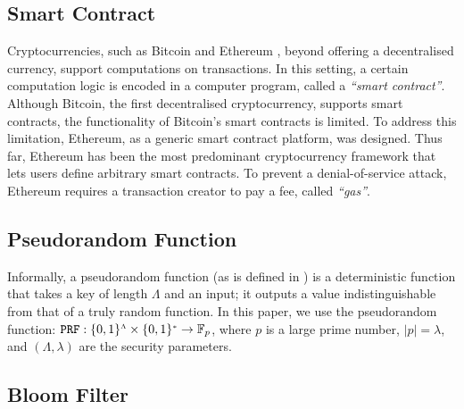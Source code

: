 \vspace{-2mm}

\subsection{Smart Contract}\label{subsec:SC}


 Cryptocurrencies, such as Bitcoin \cite{bitcoin} and Ethereum \cite{ethereum}, beyond offering a decentralised currency,  support computations on transactions. In this setting,  a certain computation logic is encoded in a computer program, called a \emph{``smart contract''}. Although Bitcoin, the first decentralised cryptocurrency, supports smart contracts, the functionality of Bitcoin's smart contracts is limited. To address this limitation, Ethereum, as a generic smart contract platform, was designed. Thus far, Ethereum has been the most predominant cryptocurrency framework that lets users define arbitrary smart contracts.  To prevent a denial-of-service attack, Ethereum requires a transaction creator to pay a  fee, called \emph{``gas''}. %





\vspace{-4mm}

\subsection{Pseudorandom Function}

\vspace{-1mm}

Informally, a pseudorandom function (as is defined in \cite{DBLP:books/crc/KatzLindell2014}) is a deterministic function that takes a key of length $\Lambda$ and an input; it outputs a value  indistinguishable from that of  a truly random function.  In this paper, we use the pseudorandom function:   $\mathtt {PRF}: \{0,1\}^{\scriptscriptstyle \Lambda}\times \{0,1\}^{\scriptscriptstyle *} \rightarrow  \mathbb{F}_p$, where $p$ is a large prime number, $|p|=\lambda$, and $(\Lambda,\lambda)$ are the security parameters. %

\subsection{Bloom Filter}

